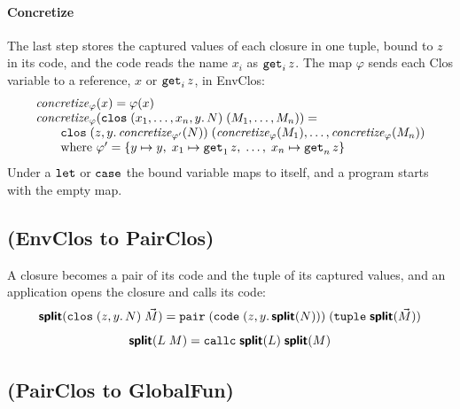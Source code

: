 \paragraph{Concretize}

The last step stores the captured values of each closure in one tuple, bound to $z$ in
its code, and the code reads the name $x_i$ as $\mathtt{get}_i\,z$. The map
$\varphi$ sends each Clos variable to a reference, $x$ or
$\mathtt{get}_i\,z$, in EnvClos:
\[
\begin{array}{@{}l@{}}
  \mathit{concretize}_\varphi(x) = \varphi(x)\\
  \mathit{concretize}_\varphi(\kw{clos}\;(x_1, \ldots, x_n, y.\,N)\;(M_1, \ldots, M_n)) =\\
  \qquad \kw{clos}\;(z, y.\,\mathit{concretize}_{\varphi'}(N))\;
      (\mathit{concretize}_\varphi(M_1), \ldots, \mathit{concretize}_\varphi(M_n))\\
  \qquad \text{where } \varphi' =
    \{ y \mapsto y,\; x_1 \mapsto \kw{get}_1\,z,\; \ldots,\; x_n \mapsto \kw{get}_n\,z \}
\end{array}
\]
Under a $\mathtt{let}$ or $\mathtt{case}$ the bound variable maps to itself,
and a program starts with the empty map.

\subsection{ (EnvClos to PairClos)}
\label{app:pass-delay}

A closure becomes a pair of its code and the tuple of its captured
values, and an application opens the closure and calls its code:
\[
  \textsf{\bfseries split}(\mathtt{clos}\;(z, y.\,N)\;\vec{M}) =
    \mathtt{pair}\;(\mathtt{code}\;(z, y.\,\textsf{\bfseries split}(N)))\;(\mathtt{tuple}\;\textsf{\bfseries split}(\vec{M}))
\]
\[
  \textsf{\bfseries split}(L\;M) = \mathtt{callc}\;\textsf{\bfseries split}(L)\;\textsf{\bfseries split}(M)
\]

\subsection{ (PairClos to GlobalFun)}
\label{app:pass-globalize}


